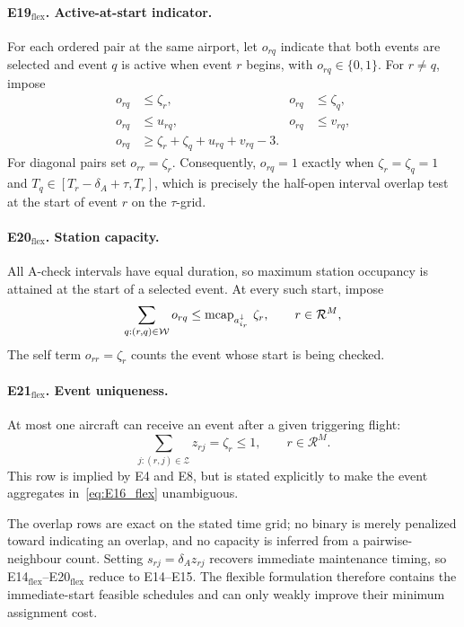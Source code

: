 \paragraph{E19$_{\mathrm{flex}}$. Active-at-start indicator.}
For each ordered pair at the same airport, let $o_{rq}$ indicate that both
events are selected and event $q$ is active when event $r$ begins, with
$o_{rq}\in\{0,1\}$. For
$r\neq q$, impose
\begin{equation}\label{eq:E19_flex}
\begin{aligned}
o_{rq}&\leq\zeta_r, & o_{rq}&\leq\zeta_q,\\
o_{rq}&\leq u_{rq}, & o_{rq}&\leq v_{rq},\\
o_{rq}&\geq\zeta_r+\zeta_q+u_{rq}+v_{rq}-3.
\end{aligned}
\end{equation}
For diagonal pairs set $o_{rr}=\zeta_r$. Consequently,
$o_{rq}=1$ exactly when $\zeta_r=\zeta_q=1$ and
$T_q\in[T_r-\delta_A+\tau,T_r]$, which is precisely the half-open interval
overlap test at the start of event $r$ on the $\tau$-grid.

\paragraph{E20$_{\mathrm{flex}}$. Station capacity.}
All A-check intervals have equal duration, so maximum station occupancy is
attained at the start of a selected event. At every such start, impose
\begin{equation}\label{eq:E20_flex}
\sum_{q:(r,q)\in\mathcal{W}}o_{rq}
\leq \operatorname{mcap}_{a^{\downarrow}_{i_r}}\,\zeta_r,
\qquad r\in\mathcal{R}^{M},
\end{equation}
The self term $o_{rr}=\zeta_r$ counts the
event whose start is being checked.

\paragraph{E21$_{\mathrm{flex}}$. Event uniqueness.}
At most one aircraft can receive an event after a given triggering flight:
\begin{equation}\label{eq:E21_flex}
\sum_{j:(r,j)\in\mathcal{Z}}z_{rj}=\zeta_r\leq1,
\qquad r\in\mathcal{R}^{M}.
\end{equation}
This row is implied by E4 and E8, but is stated explicitly to make the event
aggregates in~\eqref{eq:E16_flex} unambiguous.

The overlap rows are exact on the stated time grid; no binary is merely
penalized toward indicating an overlap, and no capacity is inferred from a
pairwise-neighbour count. Setting $s_{rj}=\delta_Az_{rj}$ recovers immediate
maintenance timing, so E14$_{\mathrm{flex}}$--E20$_{\mathrm{flex}}$ reduce to
E14--E15. The flexible formulation therefore contains the immediate-start
feasible schedules and can only weakly improve their minimum assignment cost.





